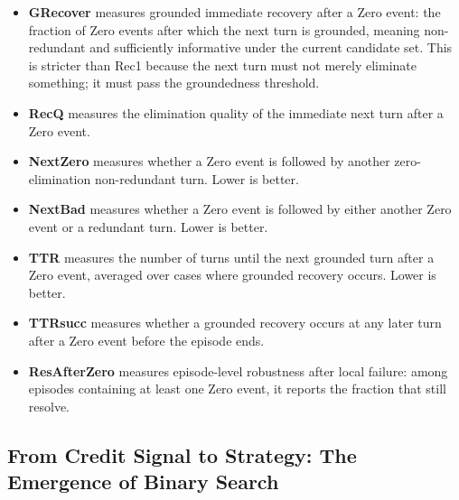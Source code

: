 \documentclass[11pt]{article}
\theoremstyle{plain}
\theoremstyle{definition}
\theoremstyle{remark}
\begin{document}
\begin{itemize}
\item \textbf{GRecover} measures grounded immediate recovery after a Zero event: the fraction of Zero events after which the next turn is grounded, meaning non-redundant and sufficiently informative under the current candidate set. This is stricter than Rec1 because the next turn must not merely eliminate something; it must pass the groundedness threshold.
 


    \item \textbf{RecQ} measures the elimination quality of the immediate next turn after a Zero event.

    \item \textbf{NextZero} measures whether a Zero event is followed by another zero-elimination non-redundant turn. Lower is better.

    \item \textbf{NextBad} measures whether a Zero event is followed by either another Zero event or a redundant turn. Lower is better.

    \item \textbf{TTR} measures the number of turns until the next grounded turn after a Zero event, averaged over cases where grounded recovery occurs. Lower is better.

    \item \textbf{TTRsucc} measures whether a grounded recovery occurs at any later turn after a Zero event before the episode ends.

    \item \textbf{ResAfterZero} measures episode-level robustness after local failure: among episodes containing at least one Zero event, it reports the fraction that still resolve.
\end{itemize}
 

\subsection{From Credit Signal to Strategy: The Emergence of Binary Search}
\end{document}
